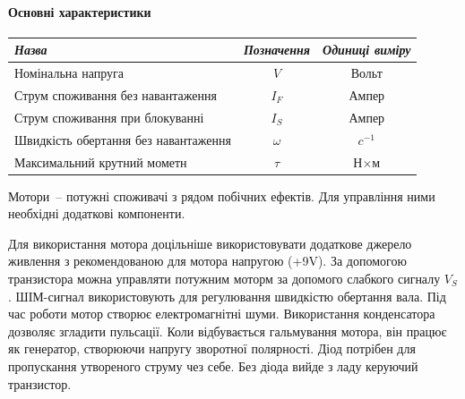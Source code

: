 \documentclass[12pt,a4paper]{report}  %
\begin{document}
\paragraph{Основні характеристики}
\begin{center}
\begin{tabular}{|l|c|c|}
\hline
\textit{Назва} & \textit{Позначення} & \textit{Одиниці виміру} \\
\hline
Номінальна напруга & $V$ & Вольт \\
\hline		
Струм споживання без навантаження & $I_F$ & Ампер \\
\hline
Струм споживання при блокуванні & $I_S$ & Ампер \\
\hline
Швидкість обертання без навантаження & $\omega$ & $c^{-1}$ \\
\hline
Максимальний крутний мометн & $\tau$ & Н$\times$м \\
\hline
\end{tabular}
\end{center}

Мотори~-- потужні споживачі з рядом побічних ефектів. Для управління ними необхідні додаткові компоненти.

Для використання мотора доцільніше використовувати додаткове джерело живлення з рекомендованою для мотора напругою (+9V).
За допомогою транзистора можна управляти потужним моторм за допомого слабкого сигналу $V_S$.
ШІМ-сигнал використовують для регулювання швидкістю обертання вала.
Під час роботи мотор створює електромагнітні шуми. Використання конденсатора дозволяє згладити пульсації.
Коли відбувається гальмування мотора, він працює як генератор, створюючи напругу зворотної полярності. Діод потрібен для пропускання утвореного струму чез себе. Без діода вийде з ладу керуючий транзистор.

\begin{figure}[h!]
\label{ris:image}
\end{figure}
\end{document}
